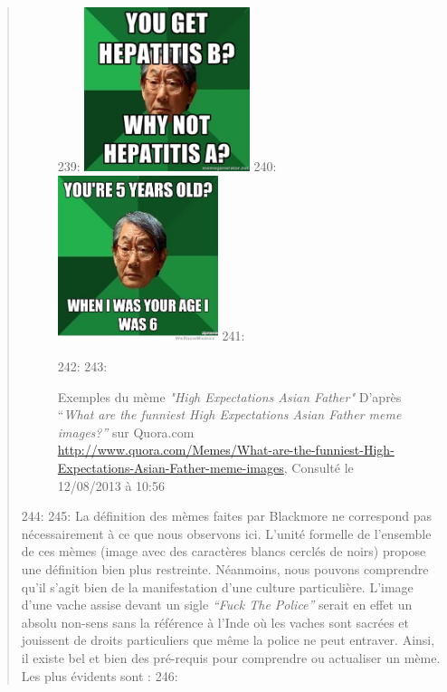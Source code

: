 \begin{quote}
\begin{figure}
239:     \includegraphics[width=1.9004in,height=1.8894in]{figures/chap2/chapitre2-img12.jpg}
240:     \includegraphics[width=1.8449in,height=1.9004in]{figures/chap2/chapitre2-img13.jpg}
241:     \caption[\textit{"High Expectations Asian Father"} d'après Quora.com]{Exemples du m\`eme \textit{"High Expectations Asian Father"} D{\textquoteright}apr\`es {\textquotedblleft}\textit{What are the funniest High Expectations Asian Father meme images?{\textquotedblright}} sur Quora.com \url{http://www.quora.com/Memes/What-are-the-funniest-High-Expectations-Asian-Father-meme-images}, Consult\'e le 12/08/2013 \`a 10:56}
242:     \label{fig:severe-chinese-dad}
243: \end{figure}
244: 
245: La d\'efinition des m\`emes faites par Blackmore ne correspond pas n\'ecessairement \`a ce que nous observons ici. L{\textquoteright}unit\'e formelle de l{\textquoteright}ensemble de ces m\`emes (image avec des caract\`eres blancs cercl\'es de noirs) propose une d\'efinition bien plus restreinte. N\'eanmoins, nous pouvons comprendre qu{\textquoteright}il s{\textquoteright}agit bien de la manifestation d{\textquoteright}une culture particuli\`ere. L{\textquoteright}image d{\textquoteright}une vache assise devant un sigle \textit{{\textquotedblleft}Fuck The Police{\textquotedblright} }serait en effet un absolu non-sens sans la r\'ef\'erence \`a l{\textquoteright}Inde o\`u les vaches sont sacr\'ees et jouissent de droits particuliers que m\^eme la police ne peut entraver. Ainsi, il existe bel et bien des pr\'e-requis pour comprendre ou actualiser un m\`eme. Les plus \'evidents sont :
246: 

\end{quote}
